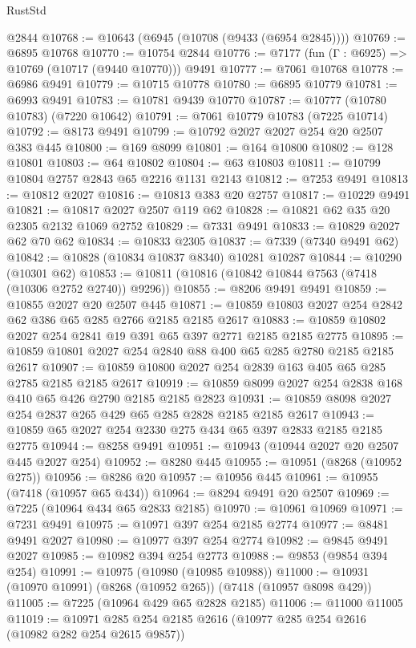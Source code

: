 \begin{lexlean}{RustStd}
\begin{coremodule}
    @2844
@10768 := @10643 (@6945 (@10708 (@9433 (@6954 @2845))))
@10769 := @6895 @10768
@10770 := @10754 @2844
@10776 := @7177 (fun (Γ : @6925) => @10769 (@10717 (@9440 @10770))) @9491
@10777 := @7061 @10768
@10778 := @6986 @9491
@10779 := @10715 @10778
@10780 := @6895 @10779
@10781 := @6993 @9491
@10783 := @10781 @9439 @10770
@10787 := @10777 (@10780 @10783) (@7220 @10642)
@10791 := @7061 @10779 @10783 (@7225 @10714)
@10792 := @8173 @9491
@10799 := @10792 @2027 @2027 @254 @20 @2507 @383 @445
@10800 := @169 @8099
@10801 := @164 @10800
@10802 := @128 @10801
@10803 := @64 @10802
@10804 := @63 @10803
@10811 := @10799 @10804 @2757 @2843 @65 @2216 @1131 @2143
@10812 := @7253 @9491
@10813 := @10812 @2027
@10816 := @10813 @383 @20 @2757
@10817 := @10229 @9491
@10821 := @10817 @2027 @2507 @119 @62
@10828 := @10821 @62 @35 @20 @2305 @2132 @1069 @2752
@10829 := @7331 @9491
@10833 := @10829 @2027 @62 @70 @62
@10834 := @10833 @2305
@10837 := @7339 (@7340 @9491 @62)
@10842 := @10828 (@10834 @10837 @8340) @10281 @10287
@10844 := @10290 (@10301 @62)
@10853 := @10811 (@10816 (@10842 @10844 @7563 (@7418 (@10306 @2752 @2740)) @9296))
@10855 := @8206 @9491 @9491
@10859 := @10855 @2027 @20 @2507 @445
@10871 := @10859 @10803 @2027 @254 @2842 @62 @386 @65 @285 @2766 @2185 @2185 @2617
@10883 := @10859 @10802 @2027 @254 @2841 @19 @391 @65 @397 @2771 @2185 @2185 @2775
@10895 := @10859 @10801 @2027 @254 @2840 @88 @400 @65 @285 @2780 @2185 @2185 @2617
@10907 := @10859 @10800 @2027 @254 @2839 @163 @405 @65 @285 @2785 @2185 @2185 @2617
@10919 := @10859 @8099 @2027 @254 @2838 @168 @410 @65 @426 @2790 @2185 @2185 @2823
@10931 := @10859 @8098 @2027 @254 @2837 @265 @429 @65 @285 @2828 @2185 @2185 @2617
@10943 := @10859 @65 @2027 @254 @2330 @275 @434 @65 @397 @2833 @2185 @2185 @2775
@10944 := @8258 @9491
@10951 := @10943 (@10944 @2027 @20 @2507 @445 @2027 @254)
@10952 := @8280 @445
@10955 := @10951 (@8268 (@10952 @275))
@10956 := @8286 @20
@10957 := @10956 @445
@10961 := @10955 (@7418 (@10957 @65 @434))
@10964 := @8294 @9491 @20 @2507
@10969 := @7225 (@10964 @434 @65 @2833 @2185)
@10970 := @10961 @10969
@10971 := @7231 @9491
@10975 := @10971 @397 @254 @2185 @2774
@10977 := @8481 @9491 @2027
@10980 := @10977 @397 @254 @2774
@10982 := @9845 @9491 @2027
@10985 := @10982 @394 @254 @2773
@10988 := @9853 (@9854 @394 @254)
@10991 := @10975 (@10980 (@10985 @10988))
@11000 := @10931 (@10970 @10991) (@8268 (@10952 @265)) (@7418 (@10957 @8098 @429))
@11005 := @7225 (@10964 @429 @65 @2828 @2185)
@11006 := @11000 @11005
@11019 := @10971 @285 @254 @2185 @2616 (@10977 @285 @254 @2616 (@10982 @282 @254 @2615 @9857))

\end{coremodule}
\end{lexlean}
